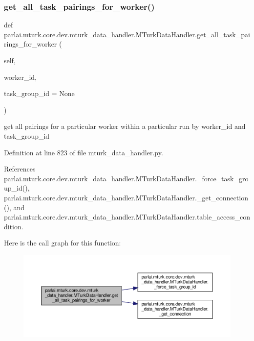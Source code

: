 \subsubsection{\texorpdfstring{get\+\_\+all\+\_\+task\+\_\+pairings\+\_\+for\+\_\+worker()}{get\_all\_task\_pairings\_for\_worker()}}
{\footnotesize\ttfamily def parlai.\+mturk.\+core.\+dev.\+mturk\+\_\+data\+\_\+handler.\+M\+Turk\+Data\+Handler.\+get\+\_\+all\+\_\+task\+\_\+pairings\+\_\+for\+\_\+worker (\begin{DoxyParamCaption}\item[{}]{self,  }\item[{}]{worker\+\_\+id,  }\item[{}]{task\+\_\+group\+\_\+id = {\ttfamily None} }\end{DoxyParamCaption})}

\begin{DoxyVerb}get all pairings for a particular worker within a
particular run by worker_id and task_group_id
\end{DoxyVerb}
 

Definition at line 823 of file mturk\+\_\+data\+\_\+handler.\+py.



References parlai.\+mturk.\+core.\+dev.\+mturk\+\_\+data\+\_\+handler.\+M\+Turk\+Data\+Handler.\+\_\+force\+\_\+task\+\_\+group\+\_\+id(), parlai.\+mturk.\+core.\+dev.\+mturk\+\_\+data\+\_\+handler.\+M\+Turk\+Data\+Handler.\+\_\+get\+\_\+connection(), and parlai.\+mturk.\+core.\+dev.\+mturk\+\_\+data\+\_\+handler.\+M\+Turk\+Data\+Handler.\+table\+\_\+access\+\_\+condition.

Here is the call graph for this function\+:
\nopagebreak
\begin{figure}[H]
\begin{center}
\leavevmode
\includegraphics[width=350pt]{classparlai_1_1mturk_1_1core_1_1dev_1_1mturk__data__handler_1_1MTurkDataHandler_a497bab989cb0979d44136b232a99f9a7_cgraph}
\end{center}
\end{figure}
\mbox{\label{classparlai_1_1mturk_1_1core_1_1dev_1_1mturk__data__handler_1_1MTurkDataHandler_a3e7435a5ea6af94b4d668c095184a234}} 
